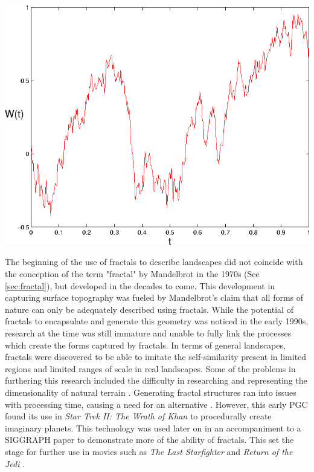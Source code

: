 \documentclass[10pt]{report}
\begin{document}
		\begin{minipage}{\textwidth}
			\centering
			\includegraphics[scale=.3]{wiener-process}
			\label{fig:wiener-proc}
		\end{minipage} 
		
		The beginning of the use of fractals to describe landscapes did not coincide with the conception of the term "fractal" by Mandelbrot in the 1970s (See \autoref{sec:fractal}), but developed in the decades to come. This development in capturing surface topography was fueled by Mandelbrot's claim that all forms of nature can only be adequately described using fractals. While the potential of fractals to encapsulate and generate this geometry was noticed in the early 1990s, research at the time was still immature and unable to fully link the processes which create the forms captured by fractals. In terms of general landscapes, fractals were discovered to be able to imitate the self-similarity present in limited regions and limited ranges of scale in real landscapes. Some of the problems in furthering this research included the difficulty in researching and representing the dimensionality of natural terrain \cite{XU1993245}. Generating fractal structures ran into issues with processing time, causing a need for an alternative \cite{inbook}. However, this early PGC found its use in \emph{Star Trek II: The Wrath of Khan} \cite{startrek} to procedurally create imaginary planets. This technology was used later on in an accompaniment to a SIGGRAPH paper to demonstrate more of the ability of fractals. This set the stage for further use in movies such as \emph{The Last Starfighter} and \emph{Return of the Jedi} \cite{ibm-fractal}. 
		
\end{document}
